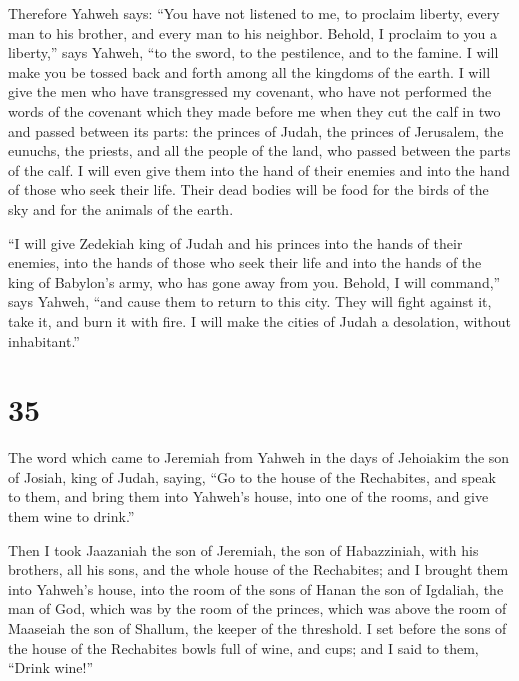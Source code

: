  Therefore Yahweh says: ``You have not listened to me, to
proclaim liberty, every man to his brother, and every man to his
neighbor. Behold, I proclaim to you a liberty,'' says Yahweh, ``to the
sword, to the pestilence, and to the famine. I will make you be tossed
back and forth among all the kingdoms of the earth.  I will
give the men who have transgressed my covenant, who have not performed
the words of the covenant which they made before me when they cut the
calf in two and passed between its parts:  the princes of
Judah, the princes of Jerusalem, the eunuchs, the priests, and all the
people of the land, who passed between the parts of the calf.
 I will even give them into the hand of their enemies and
into the hand of those who seek their life. Their dead bodies will be
food for the birds of the sky and for the animals of the earth.

 ``I will give Zedekiah king of Judah and his princes into
the hands of their enemies, into the hands of those who seek their life
and into the hands of the king of Babylon's army, who has gone away from
you.  Behold, I will command,'' says Yahweh, ``and cause
them to return to this city. They will fight against it, take it, and
burn it with fire. I will make the cities of Judah a desolation, without
inhabitant.''

\hypertarget{section-34}{%
\section{35}\label{section-34}}

 The word which came to Jeremiah from Yahweh in the days of
Jehoiakim the son of Josiah, king of Judah, saying,  ``Go to
the house of the Rechabites, and speak to them, and bring them into
Yahweh's house, into one of the rooms, and give them wine to drink.''

 Then I took Jaazaniah the son of Jeremiah, the son of
Habazziniah, with his brothers, all his sons, and the whole house of the
Rechabites;  and I brought them into Yahweh's house, into
the room of the sons of Hanan the son of Igdaliah, the man of God, which
was by the room of the princes, which was above the room of Maaseiah the
son of Shallum, the keeper of the threshold.  I set before
the sons of the house of the Rechabites bowls full of wine, and cups;
and I said to them, ``Drink wine!''

